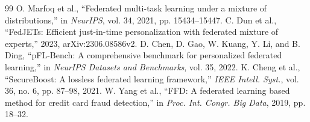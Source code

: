 \documentclass[a4paper, 10pt, conference]{ieeeconf}
\begin{document}
\begin{thebibliography}{99}
 O. Marfoq et al., ``Federated multi-task learning under a mixture of distributions,'' in \emph{NeurIPS}, vol. 34, 2021, pp. 15434--15447.
 C. Dun et al., ``FedJETs: Efficient just-in-time personalization with federated mixture of experts,'' 2023, arXiv:2306.08586v2.
 D. Chen, D. Gao, W. Kuang, Y. Li, and B. Ding, ``pFL-Bench: A comprehensive benchmark for personalized federated learning,'' in \emph{NeurIPS Datasets and Benchmarks}, vol. 35, 2022.
 K. Cheng et al., ``SecureBoost: A lossless federated learning framework,'' \emph{IEEE Intell. Syst.}, vol. 36, no. 6, pp. 87--98, 2021.
 W. Yang et al., ``FFD: A federated learning based method for credit card fraud detection,'' in \emph{Proc. Int. Congr. Big Data}, 2019, pp. 18--32.
\end{thebibliography}
\end{document}
